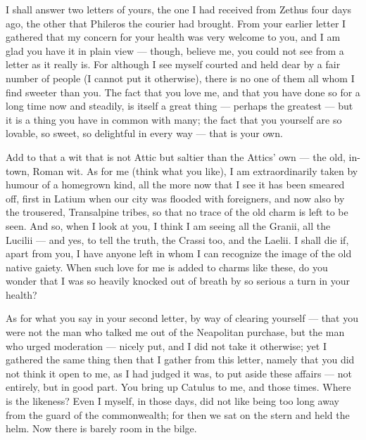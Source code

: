 

 I shall answer two letters of yours, the one I had received from Zethus four days ago, the other that Phileros the courier had brought. From your earlier letter I gathered that my concern for your health was very welcome to you, and I am glad you have it in plain view --- though, believe me, you could not see from a letter as it really is. For although I see myself courted and held dear by a fair number of people (I cannot put it otherwise), there is no one of them all whom I find sweeter than you. The fact that you love me, and that you have done so for a long time now and steadily, is itself a great thing --- perhaps the greatest --- but it is a thing you have in common with many; the fact that you yourself are so lovable, so sweet, so delightful in every way --- that is your own.

 Add to that a wit that is not Attic but saltier than the Attics' own --- the old, in-town, Roman wit. As for me (think what you like), I am extraordinarily taken by humour of a homegrown kind, all the more now that I see it has been smeared off, first in Latium when our city was flooded with foreigners, and now also by the trousered, Transalpine tribes, so that no trace of the old charm is left to be seen. And so, when I look at you, I think I am seeing all the Granii, all the Lucilii --- and yes, to tell the truth, the Crassi too, and the Laelii. I shall die if, apart from you, I have anyone left in whom I can recognize the image of the old native gaiety. When such love for me is added to charms like these, do you wonder that I was so heavily knocked out of breath by so serious a turn in your health?

 As for what you say in your second letter, by way of clearing yourself --- that you were not the man who talked me out of the Neapolitan purchase, but the man who urged moderation --- nicely put, and I did not take it otherwise; yet I gathered the same thing then that I gather from this letter, namely that you did not think it open to me, as I had judged it was, to put aside these affairs --- not entirely, but in good part. You bring up Catulus to me, and those times. Where is the likeness? Even I myself, in those days, did not like being too long away from the guard of the commonwealth; for then we sat on the stern and held the helm. Now there is barely room in the bilge.

